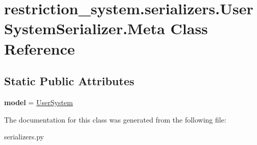 \hypertarget{classrestriction__system_1_1serializers_1_1UserSystemSerializer_1_1Meta}{}\section{restriction\+\_\+system.\+serializers.\+User\+System\+Serializer.\+Meta Class Reference}
\label{classrestriction__system_1_1serializers_1_1UserSystemSerializer_1_1Meta}
\subsection*{Static Public Attributes}
\begin{DoxyCompactItemize}
\item 
\hypertarget{classrestriction__system_1_1serializers_1_1UserSystemSerializer_1_1Meta_a0b07d3cb55bcab5742cb75fce2c12b49}{}{\bfseries model} = \hyperlink{classrestriction__system_1_1models_1_1UserSystem}{User\+System}\label{classrestriction__system_1_1serializers_1_1UserSystemSerializer_1_1Meta_a0b07d3cb55bcab5742cb75fce2c12b49}

\end{DoxyCompactItemize}


The documentation for this class was generated from the following file\+:\begin{DoxyCompactItemize}
\item 
serializers.\+py\end{DoxyCompactItemize}
